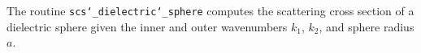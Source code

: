 \clearpage


The routine \texttt{scs\char`_dielectric\char`_sphere} computes the scattering cross section of a dielectric sphere given the inner and outer wavenumbers $k_1$, $k_2$, and sphere radius $a$.  

{\footnotesize
{}
}

%
%
%
%
%
%
%
%
%
%
%
%
%
%
%

